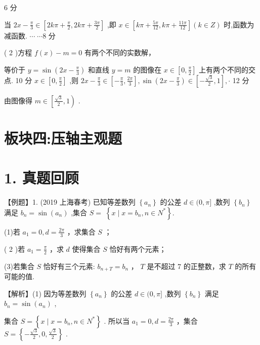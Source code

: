\documentclass[10pt]{article}
\begin{document}
6 分

当 \({2x} - \frac{\pi }{3} \in  \left\lbrack  {{2k\pi } + \frac{\pi }{2},{2k\pi } + \frac{3\pi }{2}}\right\rbrack\) ,即 \(x \in  \left\lbrack  {{k\pi } + \frac{5\pi }{12},{k\pi } + \frac{11\pi }{12}}\right\rbrack  \left( {k \in  Z}\right)\) 时,函数为减函数. \(\cdots \; \cdots 8\) 分

( 2 )方程 \(f\left( x\right)  - m = 0\) 有两个不同的实数解，

等价于 \(y = \sin \left( {{2x} - \frac{\pi }{3}}\right)\) 和直线 \(y = m\) 的图像在 \(x \in  \left\lbrack  {0,\frac{\pi }{2}}\right\rbrack\) 上有两个不同的交点. 10 分 \(x \in  \left\lbrack  {0,\frac{\pi }{2}}\right\rbrack\) ,则 \({2x} - \frac{\pi }{3} \in  \left\lbrack  {-\frac{\pi }{3},\frac{2\pi }{3}}\right\rbrack  ,\sin \left( {{2x} - \frac{\pi }{3}}\right)  \in  \left\lbrack  {-\frac{\sqrt{3}}{2},1}\right\rbrack  , \cdot\) 12 分

由图像得 \(m \in  \left\lbrack  {\frac{\sqrt{3}}{2},1}\right)\) .

\section*{板块四:压轴主观题}

\section*{1. 真题回顾}

【例题】1. (2019 上海春考) 已知等差数列 \(\left\{  {a}_{n}\right\}\) 的公差 \(d \in  (0,\pi \rbrack\) ,数列 \(\left\{  {b}_{n}\right\}\) 满足 \({b}_{n} = \sin \left( {a}_{n}\right)\) ,集合 \(S = \; \left\{  {x \mid  x = {b}_{n},n \in  {N}^{ * }}\right\}  .\)

(1)若 \({a}_{1} = 0,d = \frac{2\pi }{3}\) ，求集合 \(S\) ；

( 2 )若 \({a}_{1} = \frac{\pi }{2}\) ，求 \(d\) 使得集合 \(S\) 恰好有两个元素；

(3)若集合 \(S\) 恰好有三个元素: \({b}_{n + T} = {b}_{n}\) ， \(T\) 是不超过 7 的正整数，求 \(T\) 的所有可能的值.

【解析】(1) 因为等差数列 \(\left\{  {a}_{n}\right\}\) 的公差 \(d \in  (0,\pi \rbrack\) ,数列 \(\left\{  {b}_{n}\right\}\) 满足 \({b}_{n} = \sin \left( {a}_{n}\right)\) ,

集合 \(S = \left\{  {x \mid  x = {b}_{n},n \in  {N}^{ * }}\right\}\) . 所以当 \({a}_{1} = 0,d = \frac{2\pi }{3}\) ，集合 \(S = \left\{  {-\frac{\sqrt{3}}{2},0,\frac{\sqrt{3}}{2}}\right\}\) .
\end{document}
